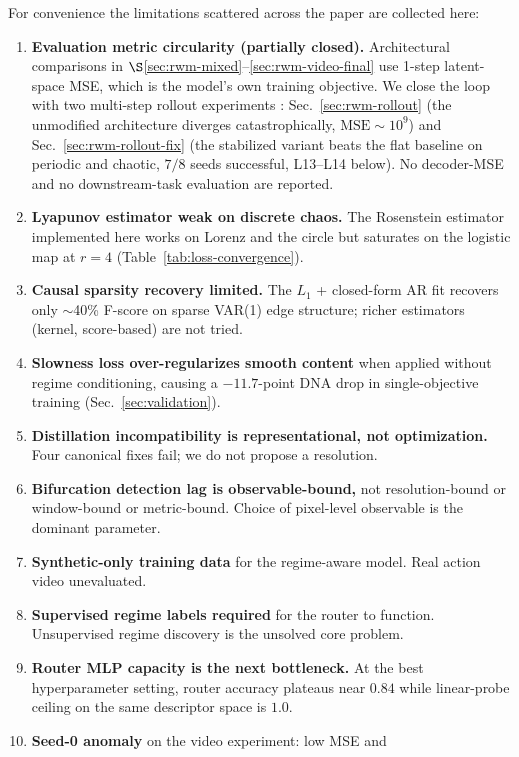 \documentclass[11pt,a4paper]{article}
\begin{document}
For convenience the limitations scattered across the paper are
collected here:

\begin{enumerate}[label=L\arabic*., leftmargin=*]
\item \textbf{Evaluation metric circularity (partially closed).}
  Architectural comparisons in
  $\S$\ref{sec:rwm-mixed}--\ref{sec:rwm-video-final} use 1-step
  latent-space MSE, which is the model's own training objective.
  We close the loop with two multi-step rollout experiments :
  Sec.~\ref{sec:rwm-rollout} (the unmodified architecture diverges
  catastrophically, $\mathrm{MSE}{\sim}10^9$) and
  Sec.~\ref{sec:rwm-rollout-fix} (the stabilized variant beats the
  flat baseline on periodic and chaotic, $7/8$ seeds successful,
  L13--L14 below). No decoder-MSE and no downstream-task evaluation
  are reported.
\item \textbf{Lyapunov estimator weak on discrete chaos.} The
  Rosenstein estimator implemented here works on Lorenz and the
  circle but saturates on the logistic map at $r{=}4$
  (Table~\ref{tab:loss-convergence}).
\item \textbf{Causal sparsity recovery limited.} The $L_1$ +
  closed-form AR fit recovers only $\sim$40\% F-score on sparse VAR(1)
  edge structure; richer estimators (kernel, score-based) are not tried.
\item \textbf{Slowness loss over-regularizes smooth content} when
  applied without regime conditioning, causing a $-11.7$-point DNA
  drop in single-objective training (Sec.~\ref{sec:validation}).
\item \textbf{Distillation incompatibility is representational, not
  optimization.} Four canonical fixes fail; we do not propose a
  resolution.
\item \textbf{Bifurcation detection lag is observable-bound,} not
  resolution-bound or window-bound or metric-bound. Choice of
  pixel-level observable is the dominant parameter.
\item \textbf{Synthetic-only training data} for the regime-aware
  model. Real action video unevaluated.
\item \textbf{Supervised regime labels required} for the router to
  function. Unsupervised regime discovery is the unsolved core problem.
\item \textbf{Router MLP capacity is the next bottleneck.} At the
  best hyperparameter setting, router accuracy plateaus near $0.84$
  while linear-probe ceiling on the same descriptor space is $1.0$.
\item \textbf{Seed-0 anomaly} on the video experiment: low MSE and

\end{enumerate}
\end{document}
